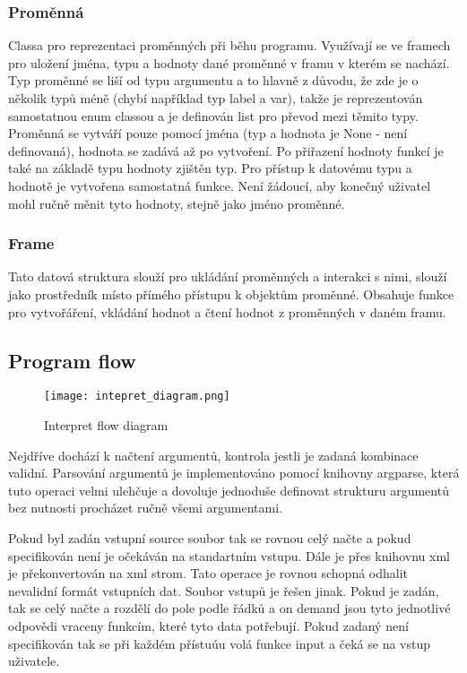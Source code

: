 \subsubsection{Proměnná}
Classa pro reprezentaci proměnných při běhu programu. Využívají se ve framech pro uložení jména, typu a hodnoty dané proměnné v framu v kterém se nachází.
Typ proměnné se liší od typu argumentu a to hlavně z důvodu, že zde je o několik typů méně (chybí například typ label a var), takže je reprezentován samostatnou enum classou a je definován list pro převod mezi těmito typy.
Proměnná se vytváří pouze pomocí jména (typ a hodnota je None - není definovaná), hodnota se zadává až po vytvoření.
Po přiřazení hodnoty funkcí je také na základě typu hodnoty zjištěn typ. Pro přístup k datovému typu a hodnotě je vytvořena samostatná funkce. Není žádoucí, aby konečný uživatel mohl ručně měnit tyto hodnoty, stejně jako jméno proměnné.

\subsubsection{Frame}
Tato datová struktura slouží pro ukládání proměnných a interakci s nimi, slouží jako prostředník místo přímého přístupu k objektům proměnné.
Obsahuje funkce pro vytvořáření, vkládání hodnot a čtení hodnot z proměnných v daném framu.


\subsection{Program flow}

\begin{figure}[H] 
	\centering
	\texttt{[image: intepret\_diagram.png]}
	\caption{Interpret flow diagram}
\end{figure}

Nejdříve dochází k načtení argumentů, kontrola jestli je zadaná kombinace validní. Parsování argumentů je implementováno pomocí knihovny argparse, která tuto operaci velmi ulehčuje a dovoluje jednoduše definovat strukturu argumentů bez nutnosti procházet ručně všemi argumentami.

Pokud byl zadán vstupní source soubor tak se rovnou celý načte a pokud specifikován není je očekáván na standartním vstupu. Dále je přes knihovnu xml je překonvertován na xml strom. Tato operace je rovnou schopná odhalit nevalidní formát vstupních dat.
Soubor vstupů je řešen jinak. Pokud je zadán, tak se celý načte a rozdělí do pole podle řádků a on demand jsou tyto jednotlivé odpovědi vraceny funkcím, které tyto data potřebují. Pokud zadaný není specifikován tak se při každém přístuúu volá funkce input a čeká se na vstup uživatele.


